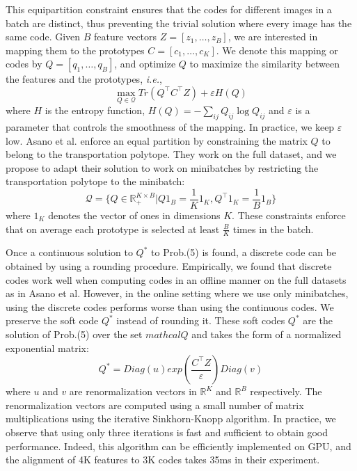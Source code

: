 \documentclass{tufte-handout}
\begin{document}
This equipartition constraint ensures that the codes for different images in a batch are distinct, thus preventing the trivial solution where every image has the same code.
Given $B$ feature vectors $Z = [z_1, \ldots, z_B]$, we are interested in mapping them to the prototypes $C = [c_1, \ldots, c_K]$. 
We denote this mapping or codes by $Q = [q_1, \ldots, q_B]$, and optimize $Q$ to maximize the similarity between the features and the prototypes, \textit{i.e.},
\begin{equation}
  \max_{Q \in \mathcal{Q} }Tr(Q^\top C^\top Z) + \varepsilon H(Q)
\end{equation}
where $H$ is the entropy function, $H(Q) = -\sum_{ij}Q_{ij}\log Q_{ij}$ and $\varepsilon$ is a parameter that controls the smoothness of the mapping.
In practice, we keep $\varepsilon$ low. Asano et al. enforce an equal partition by constraining the matrix $Q$ to belong to the transportation polytope. 
They work on the full dataset, and we propose to adapt their solution to work on minibatches by restricting the transportation polytope to the minibatch:
\begin{equation}
  \mathcal{Q} = \{ Q \in \mathbb{R}^{K \times B}_{+} | Q1_B = \frac{1}{K}1_K, Q^{\top}1_K = \frac{1}{B}1_B\}
\end{equation}
where $1_K$ denotes the vector of ones in dimensions $K$. These constraints enforce that on average each prototype is selected at least $\frac{B}{K}$ times in the batch.

Once a continuous solution to $Q^{*}$ to Prob.(5) is found, a discrete code can be obtained by using a rounding procedure.
Empirically, we found that discrete codes work well when computing codes in an offline manner on the full datasets as in Asano et al. 
However, in the online setting where we use only minibatches, using the discrete codes performs worse than using the continuous codes.
We preserve the soft code $Q^{*}$ instead of rounding it. These soft codes $Q^{*}$ are the solution of Prob.(5) over the set $mathcal{Q}$ and takes the form of a normalized exponential matrix:
\begin{equation}
  Q^{*} = Diag(u)exp(\frac{C^\top Z}{\varepsilon})Diag(v)
\end{equation}
where $u$ and $v$ are renormalization vectors in $\mathbb{R}^K$ and $\mathbb{R}^B$ respectively.
The renormalization vectors are computed using a small number of matrix multiplications using the iterative Sinkhorn-Knopp algorithm.
In practice, we observe that using only three iterations is fast and sufficient to obtain good performance.
Indeed, this algorithm can be efficiently implemented on GPU, and the alignment of 4K features to 3K codes takes 35ms in their experiment.
\end{document}
